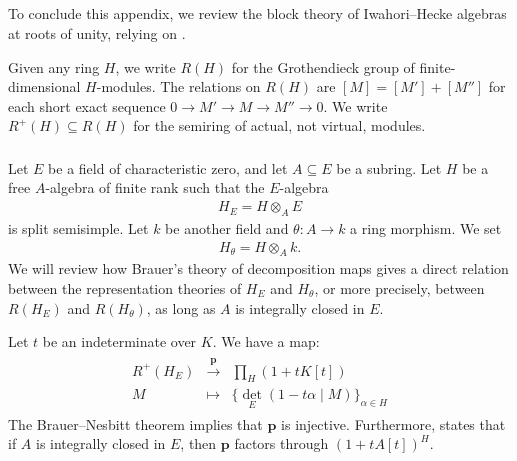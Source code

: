 \documentclass[a4paper,10pt,leqno]{amsart}
\theoremstyle{plain}
\theoremstyle{plain}
\theoremstyle{plain}
\theoremstyle{definition}
\theoremstyle{remark}
\begin{document}
\subsection{}\label{subsec:cyclotomic}

To conclude this appendix, we review the block theory of Iwahori--Hecke algebras at roots of unity, relying on \cite[Ch.\ 7]{gp}.

Given any ring $H$, we write $R(H)$ for the Grothendieck group of finite-dimensional $H$-modules.
The relations on $R(H)$ are $[M] = [M'] + [M'']$ for each short exact sequence $0 \to M' \to M \to M'' \to 0$.
We write $R^+(H) \subseteq R(H)$ for the semiring of actual, not virtual, modules.
 
\subsubsection{}

Let $E$ be a field of characteristic zero, and let $A \subseteq E$ be a subring.
Let $H$ be a free $A$-algebra of finite rank such that the $E$-algebra
\begin{align}
H_E = H \otimes_A E
\end{align}
is split semisimple.
Let $k$ be another field and $\theta : A \to k$ a ring morphism.
We set 
\begin{align}
H_\theta = H \otimes_A k.
\end{align}
We will review how Brauer's theory of decomposition maps gives a direct relation between the representation theories of $H_E$ and $H_\theta$, or more precisely, between $R(H_E)$ and $R(H_\theta)$, as long as $A$ is integrally closed in $E$.

Let $t$ be an indeterminate over $K$.
We have a map: 
\begin{align}
\begin{array}{rcl}
R^+(H_E)
	&\xrightarrow{\bm{p}} 
	&\prod_H {(1 + tK[t])}\\[1ex]
M
	&\mapsto
	&\{\det_E(1 - t\alpha \mid M)\}_{\alpha \in H}
\end{array}
\end{align}
The Brauer--Nesbitt theorem \cite[Lem.\ 7.3.2]{gp} implies that $\bm{p}$ is injective.
Furthermore, \cite[ Prop.\ 7.3.8]{gp} states that if $A$ is integrally closed in $E$, then $\bm{p}$ factors through $(1 + tA[t])^H$.
\end{document}
